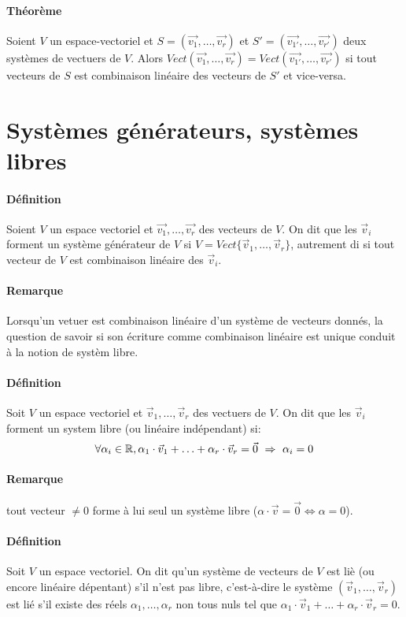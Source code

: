 \paragraph{Théorème} Soient $V$ un espace-vectoriel et $S = (\vec{v_1}, \ldots, \vec{v_r})$ et $S' = (\vec{v_{1'}}, \ldots, \vec{v_{r'}})$ deux systèmes de vectuers de $V$. Alors $Vect(\vec{v_1}, \ldots, \vec{v_r}) = Vect(\vec{v_{1'}}, \ldots, \vec{v_{r'}})$ si tout vecteurs de $S$ est combinaison linéaire des vecteurs de $S'$ et vice-versa.

%
%
\section{Systèmes générateurs, systèmes libres}
%
%
\paragraph{Définition} Soient $V$ un espace vectoriel et $\vec{v_1}, \ldots, \vec{v_r}$ des vecteurs de $V$. On dit que les $\vec{v}_i$ forment un système générateur de $V$ si $V = Vect\{\vec{v}_1, \ldots, \vec{v}_r\}$, autrement di si tout vecteur de $V$ est combinaison linéaire des $\vec{v}_i$.

\paragraph{Remarque} Lorsqu'un vetuer est combinaison linéaire d'un système de vecteurs donnés, la question de savoir si son écriture comme combinaison linéaire est unique conduit à la notion de systèm libre.

\paragraph{Définition} Soit $V$ un espace vectoriel et $\vec{v}_1, \ldots , \vec{v}_r$ des vectuers de $V$. On dit que les $\vec{v}_i$ forment un system libre (ou linéaire indépendant) si:
$$\forall \alpha_i \in \mathbb{R}, \alpha_1 \cdot \vec{v}_1 + \ldots + \alpha_r \cdot \vec{v}_r = \vec{0} ~ \Rightarrow ~ \alpha_i = 0$$
\paragraph{Remarque} tout vecteur $\neq 0$ forme à lui seul un système libre ($\alpha \cdot \vec{v} = \vec{0} \Leftrightarrow \alpha = 0$).

\paragraph{Définition} Soit $V$ un espace vectoriel. On dit qu'un système de vecteurs de $V$ est liè (ou encore linéaire dépentant) s'il n'est pas libre, c'est-à-dire le système $(\vec{v}_1, \ldots, \vec{v}_r)$ est lié s'il existe des réels $\alpha_1, \ldots, \alpha_r$ non tous nuls tel que $\alpha_1 \cdot \vec{v}_1 + \ldots + \alpha_r \cdot \vec{v}_r = 0$.
